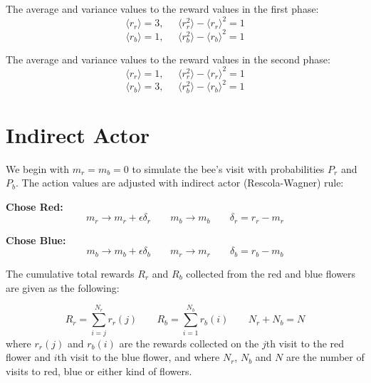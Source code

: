 \documentclass{article}
\begin{document}
The average and variance values to the reward values in the first phase:
\begin{equation*}
 \langle r_r \rangle= 3, \;\;\;\;\; \langle r_r ^2 \rangle -\langle r_r \rangle ^2 =1
\end{equation*}
\begin{equation*}
 \langle r_b \rangle= 1, \;\;\;\;\; \langle r_b ^2 \rangle -\langle r_b \rangle ^2 =1
\end{equation*}

The average and variance values to the reward values in the second phase:
 \begin{equation*}
 \langle r_r \rangle= 1, \;\;\;\;\; \langle r_r ^2 \rangle -\langle r_r \rangle ^2 =1
\end{equation*}
\begin{equation*}
 \langle r_b \rangle= 3, \;\;\;\;\; \langle r_b ^2 \rangle -\langle r_b \rangle ^2 =1
\end{equation*}

\section{Indirect Actor}
We begin with $m_r=m_b=0$ to simulate the bee's visit with probabilities $P_r$ and $P_b$. The action values are adjusted with indirect actor (Rescola-Wagner) rule:

\textbf{Chose Red:}
\begin{equation*}
 m_r\rightarrow m_r +\epsilon \delta_r \;\;\;\;\;\;\; m_b\rightarrow m_b \;\;\;\;\;\;\; \delta_r=r_r-m_r
\end{equation*}

\textbf{Chose Blue:}
\begin{equation*}
 m_b\rightarrow m_b +\epsilon \delta_b \;\;\;\;\;\;\; m_r\rightarrow m_r \;\;\;\;\;\;\; \delta_b=r_b-m_b
\end{equation*}

The cumulative total rewards $R_r$ and $R_b$ collected from the red and blue flowers are given as the following:

\begin{equation*}
 R_r=\sum_{i=j} ^{N_r} r_r(j) \;\;\;\;\;\;\; R_b=\sum_{i=1} ^{N_b} r_b(i) \;\;\;\;\;\;\; N_r+N_b=N
\end{equation*}
where $r_r(j)$ and $r_b(i)$ are the rewards collected on the $j$th visit to the red flower and $i$th visit to the blue flower, and where $N_r$, $N_b$ and $N$ are the number of visits to red, blue or either kind of flowers.  
\end{document}
